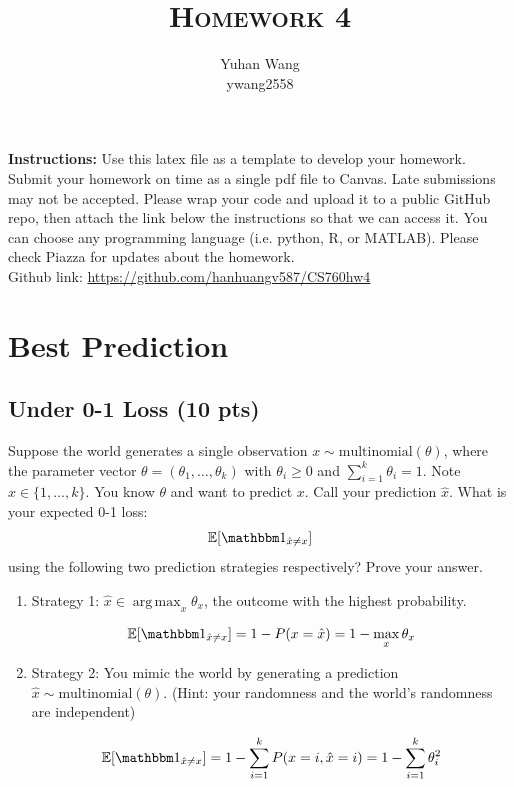 \documentclass[10pt]{article}
\title{\textsc{Homework 4}} %
\author{
Yuhan Wang \\
ywang2558 \\
}
\date{}
\theoremstyle{definition}
\DeclareMathOperator*{\argmax}{arg\,max}
\def\E{\mathbb E}
\def\ind{\mathbbm 1}
\newenvironment{soln}{
    \leavevmode\color{blue}\ignorespaces
}{}
\begin{document}
\maketitle


\textbf{Instructions:} Use this latex file as a template to develop your homework. Submit your homework on time as a single pdf file to Canvas. Late submissions may not be accepted. Please wrap your code and upload it to a public GitHub repo, then attach the link below the instructions so that we can access it. You can choose any programming language (i.e. python, R, or MATLAB). Please check Piazza for updates about the homework.\\

Github link: \url{https://github.com/hanhuangv587/CS760hw4}\\

\section{Best Prediction}
\subsection{Under 0-1 Loss (10 pts)}
Suppose the world generates a single observation $x \sim \mbox{multinomial}(\theta)$, where the parameter vector $\theta=(\theta_1, \ldots, \theta_k)$ with $\theta_i\ge 0$ and $\sum_{i=1}^k \theta_i=1$.  Note $x \in \{1, \ldots, k\}$.
You know $\theta$ and want to predict $x$.
Call your prediction $\hat x$.  What is your expected 0-1 loss:
$$\E[\ind_{\hat x \neq x}]$$
using the following two prediction strategies respectively?  Prove your answer.
\begin{enumerate}
    \item Strategy 1: $\hat x \in \argmax_x \theta_x$, the outcome with the highest probability.

          \begin{soln}
              $$\E[\ind_{\hat x \neq x}] = 1 - P(x = \hat x) = 1 - \max_x \theta_x$$
          \end{soln}

    \item Strategy 2: You mimic the world by generating a prediction $\hat x \sim \mbox{multinomial}(\theta)$.  (Hint: your randomness and the world's randomness are independent)

          \begin{soln}
              $$\E[\ind_{\hat x \neq x}] = 1 - \sum_{i=1}^{k} P(x = i, \hat x = i) = 1 - \sum_{i=1}^{k} \theta_i^2 $$
          \end{soln}

\end{enumerate}
\end{document}
